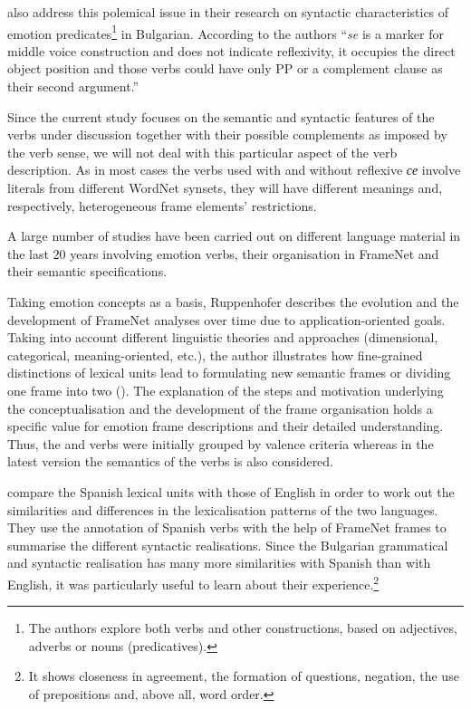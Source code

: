 \documentclass[output=paper,colorlinks,citecolor=brown]{langscibook}
\begin{document}
 \citet[76]{tisheva2022syntactic} also address this polemical issue in their research on syntactic characteristics of emotion predicates\footnote{The authors explore both verbs and other constructions, based on adjectives, adverbs or nouns (predicatives).} in Bulgarian. According to the authors ``\textit{se} is a marker for middle voice construction and does not indicate reflexivity, it occupies the direct object position and those verbs could have only PP or a complement clause as their second argument.''



Since the current study focuses on the semantic and syntactic features of the verbs under discussion together with their possible complements as imposed by the verb sense, we will not deal with this particular aspect of the verb description. As in most cases the verbs used with and without reflexive  \textit{се} involve literals from different WordNet synsets, they will have different meanings and, respectively, heterogeneous frame elements’ restrictions. 


A large number of studies have been carried out on different language material in the last 20 years involving emotion verbs, their organisation in FrameNet and their semantic specifications. 



Taking emotion concepts as a basis, Ruppenhofer describes the evolution and the development of FrameNet analyses over time due to application-oriented goals. Taking into account different linguistic theories and approaches (dimensional, categorical, meaning-oriented, etc.), the author illustrates how fine-gra\-ined distinctions of lexical units lead to formulating new semantic frames or dividing one frame into two (\cite{ruppenhofer2018treatment}). The explanation of the steps and motivation underlying the conceptualisation and the development of the frame organisation holds a specific value for emotion frame descriptions and their detailed understanding. Thus, the  and  verbs were initially grouped by valence criteria whereas in the latest version the semantics of the verbs is also considered. 

\citet{subirats2003surprise} compare the Spanish lexical units with those of English in order to work out the similarities and differences in the lexicalisation patterns of the two languages. They use the annotation of Spanish verbs with the help of FrameNet frames to summarise the different syntactic realisations.
Since the Bulgarian grammatical and syntactic realisation has many more similarities with Spanish than with English, it was particularly useful to learn about their experience.\footnote{It shows closeness in agreement, the formation of questions, negation, the use of prepositions and, above all, word order.}
\end{document}
